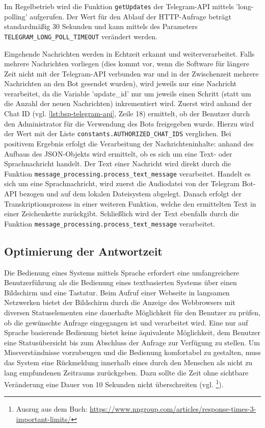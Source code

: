 Im Regelbetrieb wird die Funktion \lstinline{getUpdates} der Telegram-API mittels 'long-polling' aufgerufen. Der Wert für den Ablauf der HTTP-Anfrage beträgt standardmäßig 30 Sekunden und kann mittels des Parameters \lstinline{TELEGRAM_LONG_POLL_TIMEOUT} verändert werden.

Eingehende Nachrichten werden in Echtzeit erkannt und weiterverarbeitet. Falls mehrere Nachrichten vorliegen (dies kommt vor, wenn die Software für längere Zeit nicht mit der Telegram-API verbunden war und in der Zwischenzeit mehrere Nachrichten an den Bot gesendet wurden), wird jeweils nur eine Nachricht verarbeitet, da die Variable 'update\_id' nur um jeweils einen Schritt (statt um die Anzahl der neuen Nachrichten) inkrementiert wird. Zuerst wird anhand der Chat ID (vgl. \autoref{lst:bsp-telegram-api}, Zeile 18) ermittelt, ob der Benutzer durch den Administrator für die Verwendung des Bots freigegeben wurde. Hierzu wird der Wert mit der Liste \lstinline{constants.AUTHORIZED_CHAT_IDS} verglichen. Bei positivem Ergebnis erfolgt die Verarbeitung der Nachrichteninhalte: anhand des Aufbaus des JSON-Objekts wird ermittelt, ob es sich um eine Text- oder Sprachnachricht handelt. Der Text einer Nachricht wird direkt durch die Funktion \lstinline{message_processing.process_text_message} verarbeitet. Handelt es sich um eine Sprachnachricht, wird zuerst die Audiodatei von der Telegram Bot-API bezogen und auf dem lokalen Dateisystem abgelegt. Danach erfolgt der Transkriptionsprozess in einer weiteren Funktion, welche den ermittelten Text in einer Zeichenkette zurückgibt. Schließlich wird der Text ebenfalls durch die Funktion \lstinline{message_processing.process_text_message} verarbeitet.

\subsection{Optimierung der Antwortzeit}

Die Bedienung eines Systems mittels Sprache erfordert eine umfangreichere Benutzerführung als die Bedienung eines textbasierten Systems über einen Bildschirm und eine Tastatur. Beim Aufruf einer Webseite in langsamen Netzwerken bietet der Bildschirm durch die Anzeige des Webbrowsers mit diversen Statuselementen eine dauerhafte Möglichkeit für den Benutzer zu prüfen, ob die gewünschte Anfrage eingegangen ist und verarbeitet wird. Eine nur auf Sprache basierende Bedienung bietet keine äquivalente Möglichkeit, dem Benutzer eine Statusübersicht bis zum Abschluss der Anfrage zur Verfügung zu stellen. Um Missverständnisse vorzubeugen und die Bedienung komfortabel zu gestalten, muss das System eine Rückmeldung innerhalb eines durch den Menschen als nicht zu lang empfundenen Zeitraums zurückgeben. Dazu sollte die Zeit ohne sichtbare Veränderung eine Dauer von 10 Sekunden nicht überschreiten (vgl. \cite[Kapitel 5.5]{response-time} \footnote{Auszug aus dem Buch: \url{https://www.nngroup.com/articles/response-times-3-important-limits/}}). 

